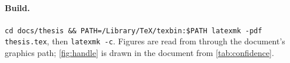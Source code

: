 \documentclass[11pt,a4paper]{report}
\begin{document}
\paragraph{Build.} \texttt{cd docs/thesis \&\& PATH=/Library/TeX/texbin:\$PATH latexmk -pdf thesis.tex}, then \texttt{latexmk -c}. Figures are read from  through the document's graphics path; \cref{fig:handle} is drawn in the document from \cref{tab:confidence}.



\end{document}
